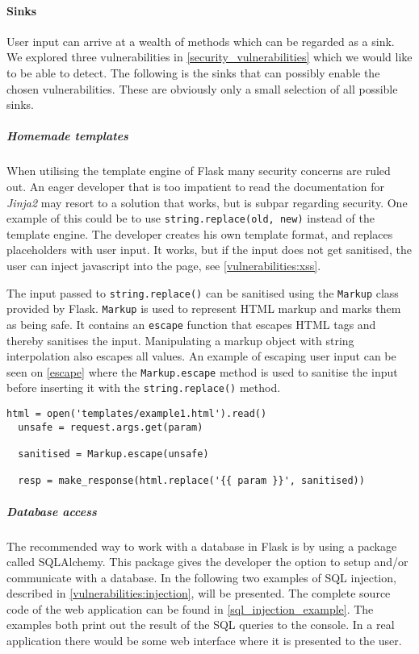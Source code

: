 \paragraph{Sinks}
User input can arrive at a wealth of methods which can be regarded as a sink.
We explored three vulnerabilities in \cref{security_vulnerabilities} which we would like to be able to detect.
The following is the sinks that can possibly enable the chosen vulnerabilities.
These are obviously only a small selection of all possible sinks.

\subparagraph{Homemade templates}
When utilising the template engine of Flask many security concerns are ruled out.
An eager developer that is too impatient to read the documentation for \emph{Jinja2} may resort to a solution that works, but is subpar regarding security.
One example of this could be to use \texttt{string.replace(old, new)} instead of the template engine.
The developer creates his own template format, and replaces placeholders with user input.
It works, but if the input does not get sanitised, the user can inject javascript into the page, see \cref{vulnerabilities:xss}.

The input passed to \texttt{string.replace()} can be sanitised using the \texttt{Markup} class provided by Flask.
\texttt{Markup} is used to represent HTML markup and marks them as being safe.
It contains an \texttt{escape} function that escapes HTML tags and thereby sanitises the input.
Manipulating a markup object with string interpolation also escapes all values.
An example of escaping user input can be seen on \cref{escape} where the \texttt{Markup.escape} method is used to sanitise the input before inserting it with the \texttt{string.replace()} method.

\begin{lstlisting}[style=python, caption={An example of escaping user input}, label={escape}]
  html = open('templates/example1.html').read()
  unsafe = request.args.get(param)

  sanitised = Markup.escape(unsafe)
  
  resp = make_response(html.replace('{{ param }}', sanitised))
\end{lstlisting}


\subparagraph{Database access}
The recommended way to work with a database in Flask is by using a package called SQLAlchemy\cite{sqlalchemy, sqlalchemy_docs}.
This package gives the developer the option to setup and/or communicate with a database.
In the following two examples of SQL injection, described in \cref{vulnerabilities:injection}, will be presented.
The complete source code of the web application can be found in \cref{sql_injection_example}.
The examples both print out the result of the SQL queries to the console.
In a real application there would be some web interface where it is presented to the user.



